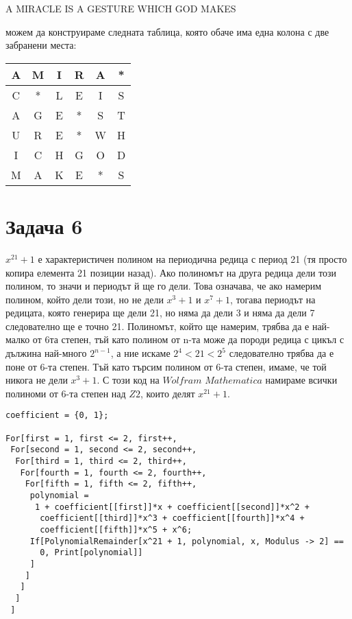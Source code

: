 \documentclass{article}
\begin{document}
\begin{center}
    A MIRACLE IS A GESTURE WHICH GOD MAKES
\end{center}

\justify
можем да конструираме следната таблица, която обаче има една колона с две забранени места: 

\begin{center}
\begin{tabular}{|c|c|c|c|c|c|}
        \hline
        A & M & I & R & A & * \\
        \hline
        C & * & L & E & I & S \\
        \hline
        A & G & E & * & S & T \\
        \hline
        U & R & E & * & W & H  \\
        \hline
        I & C & H & G & O & D \\
        \hline
        M & A & K & E & * & S \\
        \hline
        \end{tabular}
\end{center}

\section*{Задача 6}

\justify
$x^{21} + 1$ е характеристичен полином на периодична редица с период 21 (тя просто копира елемента 21 позиции назад).
Ако полиномът на друга редица дели този полином, то значи и периодът й ще го дели.
Това означава, че ако намерим полином, който дели този, но не дели $x^3 + 1$ и $x^7 + 1$, тогава
периодът на редицата, която генерира ще дели 21, но няма да дели 3 и няма да дели 7 следователно ще е точно 21.
Полиномът, който ще намерим, трябва да е най-малко от 6та степен, тъй като полином от n-та може да породи редица с
цикъл с дължина най-много $2^{n-1}$, а ние искаме $2^4 < 21 < 2^5$ следователно трябва да е поне от 6-та степен.
Тъй като търсим полином от 6-та степен, имаме, че той никога не дели $x^3 + 1$.
\justify
С този код на $Wolfram$ $Mathematica$ намираме всички полиноми от 6-та степен над $Z2$, които делят $x^{21} + 1$.

\begin{verbatim}
coefficient = {0, 1};

For[first = 1, first <= 2, first++,
 For[second = 1, second <= 2, second++,
  For[third = 1, third <= 2, third++,
   For[fourth = 1, fourth <= 2, fourth++,
    For[fifth = 1, fifth <= 2, fifth++,
     polynomial = 
      1 + coefficient[[first]]*x + coefficient[[second]]*x^2 + 
       coefficient[[third]]*x^3 + coefficient[[fourth]]*x^4 + 
       coefficient[[fifth]]*x^5 + x^6;
     If[PolynomialRemainder[x^21 + 1, polynomial, x, Modulus -> 2] == 
       0, Print[polynomial]]
     ]
    ]
   ]
  ]
 ]
\end{verbatim}
\end{document}
